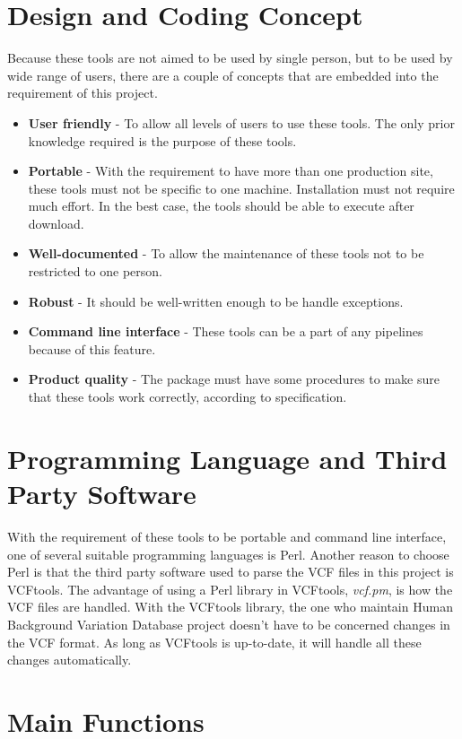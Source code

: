 \documentclass[a4paper,11pt]{kth-mag}
\begin{document}
\section{Design and Coding Concept}
Because these tools are not aimed to be used by single person, but to be used by wide range of users, there are a couple of concepts that are embedded into the requirement of this project.
\begin{itemize}
\item \textbf{User friendly} - To allow all levels of users to use these tools. The only prior knowledge required is the purpose of these tools.
\item \textbf{Portable} - With the requirement to have more than one production site, these tools must not be specific to one machine. Installation must not require much effort. In the best case, the tools should be able to execute after download.
\item \textbf{Well-documented} - To allow the maintenance of these tools not to be restricted to one person.
\item \textbf{Robust} - It should be well-written enough to be handle exceptions.
\item \textbf{Command line interface} - These tools can be a part of any pipelines because of this feature.
\item \textbf{Product quality} - The package must have some procedures to make sure that these tools work correctly, according to specification.
\end{itemize} 



\section{Programming Language and Third Party Software}
With the requirement of these tools to be portable and command line interface, one of several suitable programming languages is Perl. Another reason to choose Perl is that the third party software used to parse the VCF files in this project is VCFtools. The advantage of using a Perl library in VCFtools, \emph{vcf.pm}, is how the VCF files are handled. With the VCFtools library, the one who maintain Human Background Variation Database project doesn't have to be concerned changes in the VCF format. As long as VCFtools is up-to-date, it will handle all these changes automatically.



\section{Main Functions}
\end{document}
